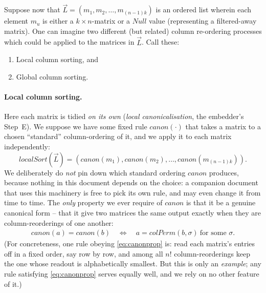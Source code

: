Suppose now that $\vec L=(m_1, m_2, \ldots, m_{(n-1)k})$ is an ordered list wherein
each element $m_u$ is either a $k\times n$-matrix or a $Null$ value (representing a
filtered-away matrix).  One can imagine two different (but related) column
re-ordering processes which could be applied to the matrices in $\vec L$.  Call
these:
\begin{enumerate}
\item
Local column sorting, and
\item
Global column sorting.
\end{enumerate}

\paragraph{Local column sorting.}
Here each matrix is tidied \emph{on its own} (\emph{local canonicalisation}, the
embedder's Step~E).  We suppose we have some fixed rule
$canon(\cdot)$ that takes a matrix to a chosen ``standard'' column-ordering of it,
and we apply it to each matrix independently:
$$localSort(\vec L) = \left(
canon(m_1), canon(m_2), \ldots, canon(m_{(n-1)k})
\right).
$$
We deliberately do \emph{not} pin down which standard ordering $canon$ produces,
because nothing in this document depends on the choice: a companion document that
uses this machinery is free to pick its own rule, and may even change it from time
to time.  The \emph{only} property we ever require of $canon$ is that it be a
genuine canonical form -- that it give two matrices the same output exactly when
they are column-reorderings of one another:
\begin{align}
canon(a)=canon(b)
\quad\iff\quad
a=colPerm(b,\sigma)\ \text{for some }\sigma.
\label{eq:canonprop}
\end{align}
(For concreteness, one rule obeying \eqref{eq:canonprop} is: read each matrix's
entries off in a fixed order, say row by row, and among all $n!$ column-reorderings
keep the one whose readout is alphabetically smallest.  But this is only an
\emph{example}; any rule satisfying \eqref{eq:canonprop} serves equally well, and we
rely on no other feature of it.)

